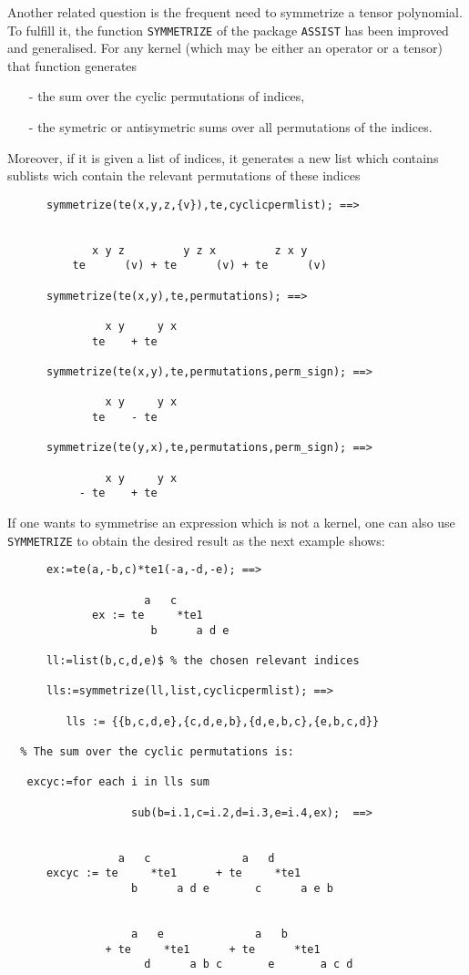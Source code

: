 Another related question is the frequent need to symmetrize
a tensor polynomial. 
To fulfill it, the function \texttt{SYMMETRIZE} 
of the package \texttt{ASSIST}  has been improved and 
generalised. For any kernel (which may be either 
an operator or a tensor) that function generates  
\begin{itemize}
\item[-] the sum over the cyclic permutations of indices,
\item[-] the symetric or antisymetric sums over all permutations
of the  indices.
\end{itemize}
Moreover, if it is given a list of indices, it generates a new list
which contains sublists wich contain  the relevant permutations of 
these indices 
\begin{verbatim}
      symmetrize(te(x,y,z,{v}),te,cyclicpermlist); ==>


             x y z         y z x         z x y
          te      (v) + te      (v) + te      (v)

      symmetrize(te(x,y),te,permutations); ==>

               x y     y x
             te    + te

      symmetrize(te(x,y),te,permutations,perm_sign); ==>

               x y     y x
             te    - te

      symmetrize(te(y,x),te,permutations,perm_sign); ==>

               x y     y x
           - te    + te
\end{verbatim}
If one wants to symmetrise an expression which is not a kernel, one 
can also use \texttt{SYMMETRIZE} to obtain the desired result as the next 
example shows:
\begin{verbatim}
      ex:=te(a,-b,c)*te1(-a,-d,-e); ==>

                     a   c
             ex := te     *te1
                      b      a d e

      ll:=list(b,c,d,e)$ % the chosen relevant indices 

      lls:=symmetrize(ll,list,cyclicpermlist); ==>

         lls := {{b,c,d,e},{c,d,e,b},{d,e,b,c},{e,b,c,d}}

  % The sum over the cyclic permutations is:

   excyc:=for each i in lls sum 

                   sub(b=i.1,c=i.2,d=i.3,e=i.4,ex);  ==>


                 a   c              a   d         
      excyc := te     *te1      + te     *te1     
                   b      a d e       c      a e b


                   a   e              a   b
               + te     *te1      + te      *te1
                     d      a b c       e       a c d 
                   
\end{verbatim}

